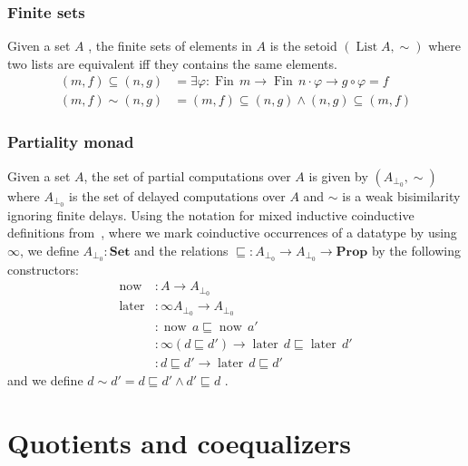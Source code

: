 \documentclass{llncs}
\newcommand{\prop}{\mathbf{Prop}}
\newcommand{\Set}{\mathbf{Set}}
\DeclareMathOperator*{\List}{\mathrm{List}}
\DeclareMathOperator*{\Fin}{\mathrm{Fin}}
\DeclareMathOperator*{\now}{\mathrm{now}}
\DeclareMathOperator*{\later}{\mathrm{later}}
\DeclareMathOperator*{\noweq}{\mathrm{now}_\sqsubseteq}
\DeclareMathOperator*{\latereq}{\mathrm{later}_\sqsubseteq}
\DeclareMathOperator*{\laterleft}{\mathrm{later}_{\mathrm{left}}}
\begin{document}
\subsubsection*{Finite sets}
Given a set $A$ , the finite sets of elements in $A$ is the setoid $(\List A,\sim)$ where two lists are equivalent if{f} they contains the same elements.
\begin{align*}
(m,f)\subseteq(n,g) &= \exists \varphi : \Fin\,m \to \Fin\,n \cdot \varphi \to g\circ\varphi = f  \\
(m,f)\sim(n,g)&= (m,f)\subseteq(n,g) \wedge (n,g)\subseteq(m,f)
\end{align*}

\subsubsection*{Partiality monad}
Given a set $A$, the set of partial computations over $A$ is given by $(A_{\bot_0},{\sim})$ where $A_{\bot_0}$ is the set of delayed computations over $A$  and $\sim$ is a weak bisimilarity ignoring finite delays. Using the notation for mixed inductive coinductive  definitions from~\cite{danielson:altenkirch:2010}, where we mark coinductive occurrences of a datatype by using $\infty$, we define $A_{\bot_0} : \Set$ and the relations $\sqsubseteq:A_{\bot_0}\to A_{\bot_0} \to \prop$ by the following constructors:
\begin{align*}
\now  &: A \to A_{\bot_0}\\
\later &: \infty A_{\bot_0} \to  A_{\bot_0}\\
\noweq &: \now\, a \sqsubseteq \now\,a'\\
\latereq &: \infty(d \sqsubseteq d') \to \later\,d \sqsubseteq \later\,d'\\
\laterleft &: d\sqsubseteq d' \to \later\,d \sqsubseteq d'
\end{align*}
and we define $d\sim d'= d\sqsubseteq d' \wedge d'\sqsubseteq d$ .

\section{Quotients and coequalizers}\label{sec:quotients}
 
\end{document}
